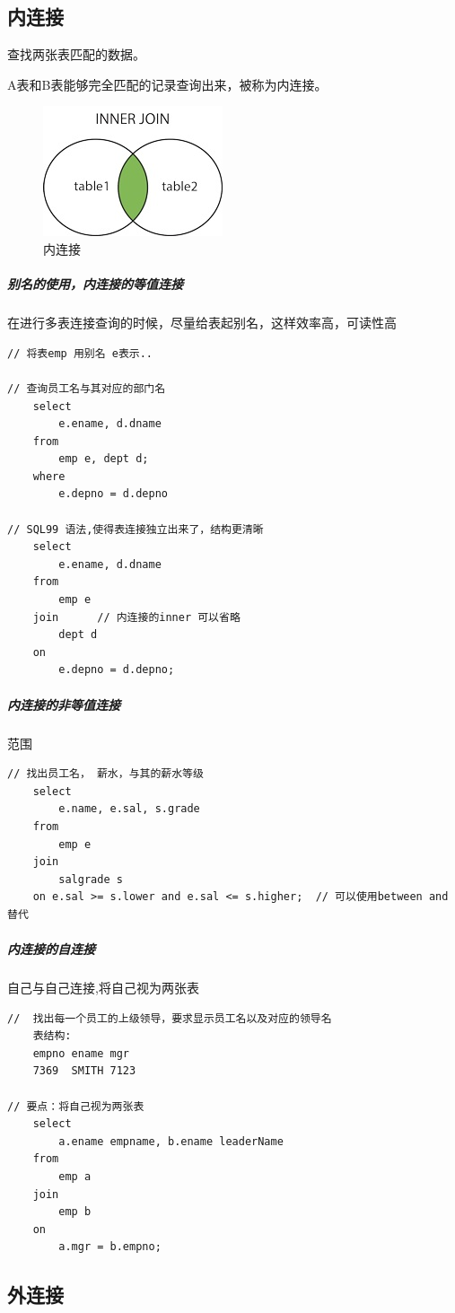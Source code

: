 \documentclass[UTF8,a4paper,12pt]{ctexbook}
\begin{document}
	\subsection{内连接}		
			查找两张表匹配的数据。
			
			A表和B表能够完全匹配的记录查询出来，被称为内连接。
			\begin{figure}[H]
				\centering
				\includegraphics[scale=1]{innoJoin}
				\caption{内连接}
			\end{figure}
			
			\subparagraph{别名的使用，内连接的等值连接} 在进行多表连接查询的时候，尽量给表起别名，这样效率高，可读性高
				\begin{lstlisting}
// 将表emp 用别名 e表示..	

// 查询员工名与其对应的部门名
	select	
		e.ename, d.dname
	from 
		emp e, dept d;
	where 
		e.depno = d.depno
		
// SQL99 语法,使得表连接独立出来了，结构更清晰
	select 
		e.ename, d.dname
	from 
		emp e
	join	  // 内连接的inner 可以省略 
	    dept d
	on 
		e.depno = d.depno;
					\end{lstlisting}
					
				\subparagraph{内连接的非等值连接} 范围
					\begin{lstlisting}
// 找出员工名， 薪水，与其的薪水等级
	select 	
		e.name, e.sal, s.grade
	from
		emp e
	join 
		salgrade s
	on e.sal >= s.lower and e.sal <= s.higher;  // 可以使用between and 替代
					\end{lstlisting}
				 
				
				\subparagraph{内连接的自连接} 自己与自己连接,将自己视为两张表
					\begin{lstlisting}
//  找出每一个员工的上级领导，要求显示员工名以及对应的领导名
	表结构:
	empno ename mgr
	7369  SMITH 7123

// 要点：将自己视为两张表
	select
		a.ename empname, b.ename leaderName
	from 
		emp a
	join
		emp b
	on 
		a.mgr = b.empno;
					\end{lstlisting}	
				
	\subsection{外连接}
\end{document}
